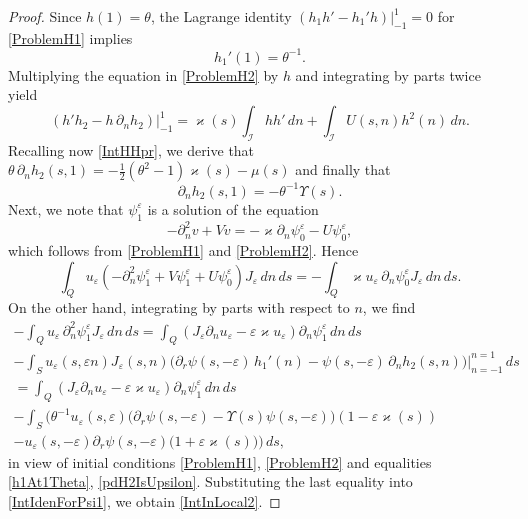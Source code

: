 \documentclass[reqno]{amsart}
\theoremstyle{plain}
\numberwithin{equation}{section}
\renewcommand{\kappa}{\varkappa}
\newcommand{\eps}{\varepsilon}
\newcommand{\cI}{\mathcal{I}}
\begin{document}
\begin{proof}
Since $h(1)=\theta$, the Lagrange identity $(h_1h'-h_1'h)|_{-1}^1=0$ for  \eqref{ProblemH1} implies
\begin{equation}\label{h1At1Theta}
  h_1'(1)=\theta^{-1}.
\end{equation}
Multiplying the equation in \eqref{ProblemH2} by $h$ and  integrating by parts twice yield
\begin{equation*}
 (h'h_2-h\,\partial_n h_2)\big|_{-1}^1=\kappa(s)\int_{\cI}hh'\,dn
  +\int_{\cI}U(s,n)h^2(n)\, dn.
\end{equation*}
Recalling now \eqref{IntHHpr}, we derive that $\theta \,\partial_n h_2(s,1)=-\tfrac{1}{2}(\theta^2-1)\kappa(s)-\mu(s)$ and finally that
\begin{equation}\label{pdH2IsUpsilon}
\partial_n h_2(s,1)=-\theta^{-1}\Upsilon(s).
\end{equation}
Next, we note that $\psi_1^\eps$ is a solution of the equation
\begin{equation*}
-\partial_n^2v+Vv=-\kappa \partial_n \psi_0^\eps-U\psi_0^\eps,
\end{equation*}
which follows from \eqref{ProblemH1} and \eqref{ProblemH2}. Hence
\begin{equation}\label{IntIdenForPsi1}
  \int_Qu_\eps (-\partial_n^2 \psi_1^\eps+V \psi_1^\eps+U \psi_0^\eps)J_\eps\,dn\,ds=-\int_Q \kappa u_\eps\, \partial_n\psi_0^\eps J_\eps\,dn\,ds.
\end{equation}
On the other hand,  integrating by parts with respect to $n$,  we find
\begin{multline*}
  -\int_Q u_\eps \,\partial_n^2 \psi_1^\eps J_\eps\,dn\,ds
  =
  \int_Q (J_\eps\partial_n u_\eps-
  \eps \kappa u_\eps )\partial_n \psi_1^\eps\,dn\,ds
  \\
  -
  \int_Su_\eps(s,\eps n) J_\eps(s,n)\big(\partial_r\psi(s,-\eps)\,h_1'(n)
     -\psi(s,-\eps)\,\partial_n h_2(s,n)\big) \Big|_{n=-1}^{n=1}\,ds
  \\
  =
  \int_Q (J_\eps\partial_n u_\eps-
  \eps \kappa u_\eps )\partial_n \psi_1^\eps\,dn\,ds
  \\-
  \int_S \bigg(\theta^{-1}u_\eps(s,\eps)\big(\partial_r\psi(s,-\eps)
    -\Upsilon(s)\psi(s,-\eps)\big)(1-\eps \kappa(s))
    \\
   -u_\eps(s,-\eps)\partial_r \psi(s,-\eps)\big(1+\eps \kappa(s)\big)
\Big)\,ds,
\end{multline*}
in view of initial conditions \eqref{ProblemH1}, \eqref{ProblemH2} and equalities \eqref{h1At1Theta},  \eqref{pdH2IsUpsilon}. Substituting
the last equality into \eqref{IntIdenForPsi1}, we obtain \eqref{IntInLocal2}.
\end{proof}
\end{document}

